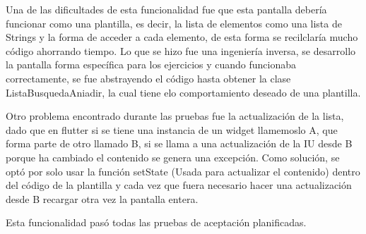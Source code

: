 Una de las dificultades de esta funcionalidad fue que esta pantalla debería funcionar como una plantilla, es decir, la lista de elementos como una lista de Strings y la forma de acceder a cada elemento, de esta forma se recilclaría mucho código ahorrando tiempo. Lo que se hizo fue una ingeniería inversa, se desarrollo la pantalla forma específica para los ejercicios y cuando funcionaba correctamente, se fue abstrayendo el código hasta obtener la clase ListaBusquedaAniadir, la cual tiene elo comportamiento deseado de una plantilla.

Otro problema encontrado durante las pruebas fue la actualización de la lista, dado que en flutter si se tiene una instancia de un widget llamemoslo A, que forma parte de otro llamado B, si se llama a una actualización de la IU desde B porque ha cambiado el contenido se genera una excepción. Como solución, se optó por solo usar la función setState (Usada para actualizar el contenido) dentro del código de la plantilla y cada vez que fuera necesario hacer una actualización desde B recargar otra vez la pantalla entera.

Esta funcionalidad pasó todas las pruebas de aceptación planificadas.


